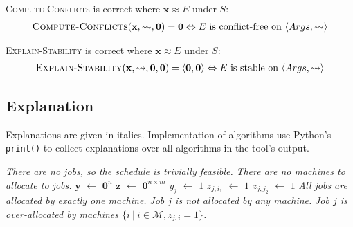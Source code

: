 \begin{theorem}
	\textsc{Compute-Conflicts} is correct where $\mathbf{x}\approx E$ under $S$:
	\begin{align*}
	\textsc{Compute-Conflicts}(\mathbf{x},\rightsquigarrow,\mathbf{0})=\mathbf{0}\Leftrightarrow E\text{ is conflict-free on }\langle Args, \rightsquigarrow\rangle
	\end{align*}
\end{theorem}

\begin{theorem}
	\textsc{Explain-Stability} is correct where $\mathbf{x}\approx E$ under $S$:
	\begin{align*}
		\textsc{Explain-Stability}(\mathbf{x},\rightsquigarrow,\mathbf{0},\mathbf{0})=\langle{\mathbf{0}},{\mathbf{0}}\rangle\Leftrightarrow E\text{ is stable on }\langle Args, \rightsquigarrow\rangle
	\end{align*}
\end{theorem}
	
\subsection{Explanation}

Explanations are given in italics. Implementation of algorithms use Python's \verb|print()| to collect explanations over all algorithms in the tool's output.

\begin{algorithm}[H]
	\caption{}
	\begin{algorithmic}[1]
					\State \emph{There are no jobs, so the schedule is trivially feasible.}
				\Else
					\State \emph{There are no machines to allocate to jobs.}
				\EndIf
			\Else
				\State $\mathbf{y}$ $\gets$ $\mathbf{0}^n$
				\State $\mathbf{z}$ $\gets$ $\mathbf{0}^{n\times m}$
								\State $y_j$ $\gets$ $1$
								\State $z_{j,i_1}$ $\gets$ $1$
								\State $z_{j,j_2}$ $\gets$ $1$
							\EndIf
						\EndFor
					\EndFor					
				\EndFor
					\State \emph{All jobs are allocated by exactly one machine.}
				\Else
							\State \emph{Job $j$ is not allocated by any machine.}
						\EndIf
							\State \emph{Job $j$ is over-allocated by machines $\{i\ |\ i\in\mathcal{M}, z_{j,i}=1\}$.}
						\EndIf
					\EndFor
				\EndIf
			\EndIf
		\EndFunction
	\end{algorithmic}
\end{algorithm}

